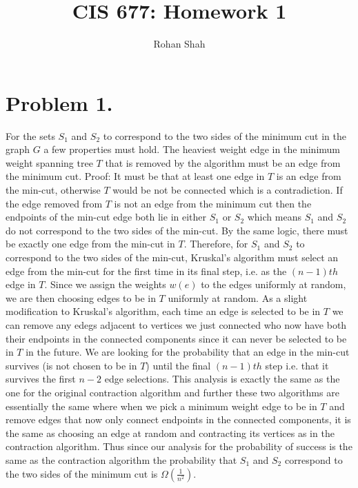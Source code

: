 \documentclass[12pt]{article}
\begin{document}
\pagestyle{plain}
\titleformat{\subsection}[runin]
  {\normalfont\large\bfseries}{\thesubsection}{1em}{}

\title{CIS 677: Homework 1}
\author{Rohan Shah}
\date{}

\maketitle

\section*{Problem 1.}
For the sets $S_1$ and $S_2$ to correspond to the two sides of the minimum cut
in the graph $G$ a few properties must hold. The heaviest weight edge in the
minimum weight spanning tree $T$ that is removed by the algorithm must be an
edge from the minimum cut. Proof: It must be that at least one edge in $T$ is an
edge from the min-cut, otherwise $T$ would be not be connected which is a contradiction.
If the edge removed from $T$ is not an edge from the minimum cut then the
endpoints of the min-cut edge both lie in either $S_1$ or $S_2$ which means
$S_1$ and $S_2$ do not correspond to the two sides of the min-cut. By the same
logic, there must be exactly one edge from the min-cut in $T$. Therefore, for
$S_1$ and $S_2$ to correspond to the two sides of the min-cut, Kruskal's
algorithm must select an edge from the min-cut for the first time in its final
step, i.e. as the $(n-1)th$ edge in $T$. Since we assign the weights $w(e)$ to
the edges uniformly at random, we are then choosing edges to be in $T$ uniformly
at random. As a slight modification to Kruskal's algorithm, each time an edge is
selected to be in $T$ we can remove any edegs adjacent to vertices we just
connected who now have both their endpoints in the connected components since it
can never be selected to be in $T$ in the future. We are looking for the
probability that an edge in the min-cut survives (is not chosen to be in $T$)
until the final $(n-1)th$ step i.e. that it survives the first $n-2$ edge
selections. This analysis is exactly the same as the one for the original
contraction algorithm and further these two algorithms are essentially the same
where when we pick a minimum weight edge to be in $T$ and remove edges that now
only connect endpoints in the connected components, it is the same as choosing
an edge at random and contracting its vertices as in the contraction algorithm.
Thus since our analysis for the probability of success is the same as the
contraction algorithm the probability that $S_1$ and $S_2$ correspond to the two
sides of the minimum cut is $\Omega(\frac{1}{n^2})$. 
\end{document}
